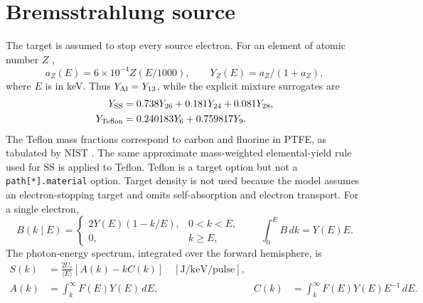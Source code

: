 \documentclass[10pt,a4paper]{article}
\begin{document}
\section{Bremsstrahlung source}
The target is assumed to stop every source electron. For an element of atomic number $Z$ \cite{coderre},
\begin{equation}a_Z(E)=6\times10^{-4}Z(E/1000),\qquad Y_Z(E)=a_Z/(1+a_Z),\end{equation}
where $E$ is in keV. Thus $Y_{\rm Al}=Y_{13}$, while the explicit mixture surrogates are
\begin{align}
Y_{\rm SS}&=0.738Y_{26}+0.181Y_{24}+0.081Y_{28},\\
Y_{\rm Teflon}&=0.240183Y_6+0.759817Y_9.
\end{align}
The Teflon mass fractions correspond to carbon and fluorine in PTFE, as tabulated by NIST \cite{teflon}. The same approximate mass-weighted elemental-yield rule used for SS is applied to Teflon. Teflon is a target option but not a \texttt{path[*].material} option. Target density is not used because the model assumes an electron-stopping target and omits self-absorption and electron transport.
For a single electron,
\begin{equation}B(k\mid E)=\begin{cases}2Y(E)(1-k/E),&0<k<E,\\0,&k\geq E,
\end{cases}\qquad \int_0^E B\,dk=Y(E)E.
\end{equation}
The photon-energy spectrum, integrated over the forward hemisphere, is
\begin{align}
S(k)&=\frac{2U_e}{\langle E\rangle}[A(k)-kC(k)]\quad[\mathrm{J/keV/pulse}],\\
A(k)&=\int_k^\infty F(E)Y(E)\,dE,&C(k)&=\int_k^\infty F(E)Y(E)E^{-1}\,dE.
\end{align}
\end{document}
